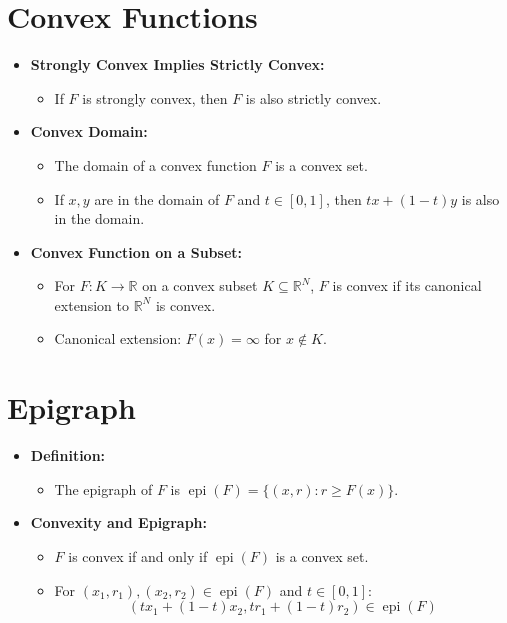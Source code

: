 \documentclass{article}
\begin{document}
\section*{Convex Functions}

\begin{itemize}[leftmargin=*, label={--}]
    \item \textbf{Strongly Convex Implies Strictly Convex:}
    \begin{itemize}
        \item If $F$ is strongly convex, then $F$ is also strictly convex.
    \end{itemize}

    \item \textbf{Convex Domain:}
    \begin{itemize}
        \item The domain of a convex function $F$ is a convex set.
        \item If $x, y$ are in the domain of $F$ and $t \in [0, 1]$, then $tx + (1 - t)y$ is also in the domain.
    \end{itemize}

    \item \textbf{Convex Function on a Subset:}
    \begin{itemize}
        \item For $F: K \to \mathbb{R}$ on a convex subset $K \subseteq \mathbb{R}^N$, $F$ is convex if its canonical extension to $\mathbb{R}^N$ is convex.
        \item Canonical extension: $F(x) = \infty$ for $x \not\in K$.
    \end{itemize}
\end{itemize}

\section*{Epigraph}

\begin{itemize}[leftmargin=*, label={--}]
    \item \textbf{Definition:}
    \begin{itemize}
        \item The epigraph of $F$ is $\operatorname{epi}(F) = \{(x, r) : r \geq F(x)\}$.
    \end{itemize}

    \item \textbf{Convexity and Epigraph:}
    \begin{itemize}
        \item $F$ is convex if and only if $\operatorname{epi}(F)$ is a convex set.
        \item For $(x_1, r_1), (x_2, r_2) \in \operatorname{epi}(F)$ and $t \in [0, 1]$:
        \[
        (tx_1 + (1 - t)x_2, tr_1 + (1 - t)r_2) \in \operatorname{epi}(F)
        \]
    \end{itemize}
\end{itemize}
\end{document}
